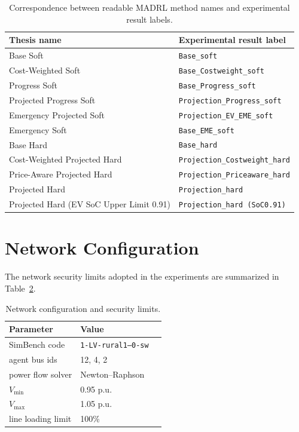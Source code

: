 \begin{table}[htpb]
  \centering
  \caption{Correspondence between readable MADRL method names and experimental result labels.}\label{tab:madrl-name-mapping}
  \begin{tabular}{ll}
    \toprule
    Thesis name & Experimental result label \\
    \midrule
    Base Soft & \texttt{Base\_soft} \\
    Cost-Weighted Soft & \texttt{Base\_Costweight\_soft} \\
    Progress Soft & \texttt{Base\_Progress\_soft} \\
    Projected Progress Soft & \texttt{Projection\_Progress\_soft} \\
    Emergency Projected Soft & \texttt{Projection\_EV\_EME\_soft} \\
    Emergency Soft & \texttt{Base\_EME\_soft} \\
    Base Hard & \texttt{Base\_hard} \\
    Cost-Weighted Projected Hard & \texttt{Projection\_Costweight\_hard} \\
    Price-Aware Projected Hard & \texttt{Projection\_Priceaware\_hard} \\
    Projected Hard & \texttt{Projection\_hard} \\
    Projected Hard (EV SoC Upper Limit 0.91) & \texttt{Projection\_hard (SoC0.91)} \\
    \bottomrule
  \end{tabular}
\end{table}

\section{Network Configuration}

The network security limits adopted in the experiments are summarized in Table~\ref{tab:network-config}.

\begin{table}[htpb]
  \centering
  \caption{Network configuration and security limits.}\label{tab:network-config}
  \begin{tabular}{lll}
    \toprule
    Parameter & Value \\
    \midrule
    SimBench code & \texttt{1-LV-rural1--0-sw} \\
    agent bus ids & 12, 4, 2 \\
    power flow solver & Newton--Raphson\\
    \(V_{\min}\) & 0.95 p.u. \\
    \(V_{\max}\) & 1.05 p.u.\\
    line loading limit & 100\%  \\
    \bottomrule
  \end{tabular}
\end{table}


